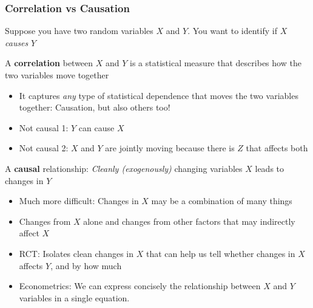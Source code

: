 \documentclass[aspectratio=169]{beamer}
\newenvironment{wideitemize}{\itemize\addtolength{\itemsep}{10pt}}{\enditemize}
\begin{document}
\begin{frame}
\frametitle{Correlation vs Causation}
\begin{wideitemize}
\item Suppose you have two random variables $X$ and $Y$. You want to identify if $X$ \textit{causes} $Y$
\item A \textbf{correlation} between $X$ and $Y$ is a statistical measure that describes how the two variables move together
\begin{itemize}
\item It captures \textit{any} type of statistical dependence that moves the two variables together: Causation, but also others too!
\item Not causal 1: $Y$ can cause $X$
\item Not causal 2: $X$ and $Y$ are jointly moving because there is $Z$ that affects both
\end{itemize}
\item A \textbf{causal} relationship: \textit{Cleanly (exogenously)} changing variables $X$ leads to changes in $Y$
\begin{itemize}
\item Much more difficult: Changes in $X$ may be a combination of many things
\item Changes from $X$ alone and changes from other factors that may indirectly affect $X$
\item RCT: Isolates clean changes in $X$ that can help us tell whether changes in $X$ affects $Y$, and by how much
\item Econometrics: We can express concisely the relationship between $X$ and $Y$ variables in a single equation. 
\end{itemize}
 \end{wideitemize}
\end{frame}
\end{document}
